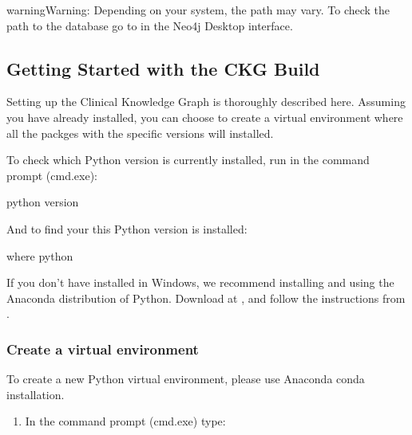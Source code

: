 \documentclass[letterpaper,10pt,english]{sphinxmanual}
\begin{document}
\begin{sphinxadmonition}{warning}{Warning:}
Depending on your system, the path may vary. To check the path to the database go to  in the Neo4j Desktop interface.
\end{sphinxadmonition}


\subsection{Getting Started with the CKG Build}
\label{\detokenize{intro/getting-started-with-windows:getting-started-with-the-ckg-build}}
Setting up the Clinical Knowledge Graph is thoroughly described here.
Assuming you have  already installed, you can choose to create a virtual environment where all the packges with the specific versions will installed.

To check which Python version is currently installed, run in the command prompt (cmd.exe):

\begin{sphinxVerbatim}[commandchars=\\\{\}]
\PYGZgt{} python \PYGZhy{}\PYGZhy{}version
\end{sphinxVerbatim}

And to find your this Python version is installed:

\begin{sphinxVerbatim}[commandchars=\\\{\}]
\PYGZgt{} where python
\end{sphinxVerbatim}

If you don’t have  installed in Windows, we recommend installing and using the Anaconda distribution of Python. Download at , and follow the instructions from .


\subsubsection{Create a virtual environment}
\label{\detokenize{intro/getting-started-with-windows:create-a-virtual-environment}}
To create a new Python virtual environment, please use Anaconda conda installation.
\begin{enumerate}
%
\item {} 
In the command prompt (cmd.exe) type:

\end{enumerate}
\end{document}
